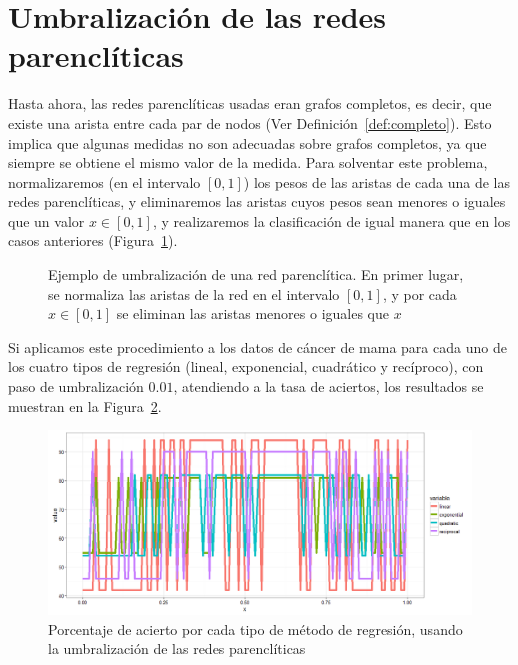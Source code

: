 \section{Umbralización de las redes parenclíticas}

Hasta ahora, las redes parenclíticas usadas eran grafos completos, es decir, que existe una arista entre cada par de nodos (Ver Definición~\ref{def:completo}). Esto implica que algunas medidas no son adecuadas sobre grafos completos, ya que siempre se obtiene el mismo valor de la medida. Para solventar este problema, normalizaremos (en el intervalo $[0,1]$) los pesos de las aristas de cada una de las redes parenclíticas, y eliminaremos las aristas cuyos pesos sean menores o iguales que un valor $x \in [0,1]$, y realizaremos la clasificación de igual manera que en los casos anteriores (Figura~\ref{fig:ejemploumbralizacion}).


\begin{figure}[tbph!]
	\centering
	\ejemploumbralizacion
	\caption{Ejemplo de umbralización de una red parenclítica. En primer lugar, se normaliza las aristas de la red en el intervalo $[0,1]$, y por cada $x \in [0,1]$ se eliminan las aristas menores o iguales que $x$}
	\label{fig:ejemploumbralizacion}
\end{figure}

Si aplicamos este procedimiento a los datos de cáncer de mama para cada uno de los cuatro tipos de regresión (lineal, exponencial, cuadrático y recíproco), con paso de umbralización $0.01$, atendiendo a la tasa de aciertos, los resultados se muestran en la Figura~\ref{fig:umbralizacion}.\\

\begin{figure}[tbph!]
	\centering
	\includegraphics[width=1\linewidth]{imagenes/cancer/umbralizacion.png}
	\caption{Porcentaje de acierto por cada tipo de método de regresión, usando la umbralización de las redes parenclíticas}
	\label{fig:umbralizacion}
\end{figure}

